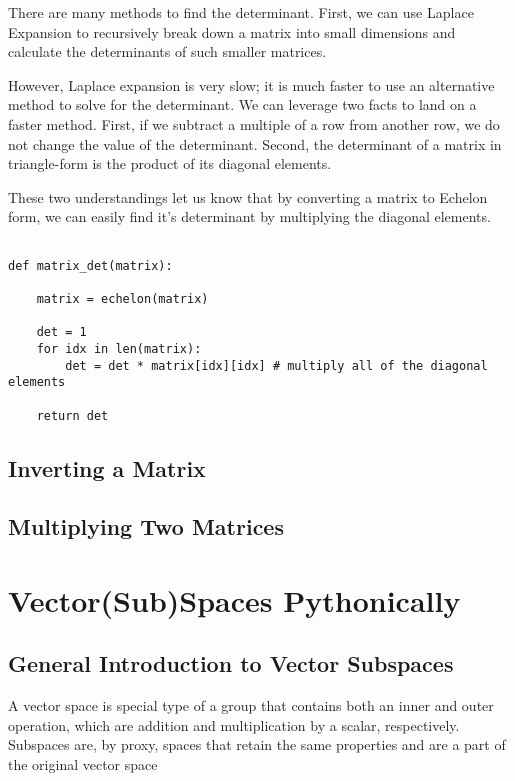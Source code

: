 \documentclass[12pt, a4paper]{article}
\begin{document}
There are many methods to find the determinant. First, we can use Laplace Expansion to recursively break down a matrix into small dimensions
and calculate the determinants of such smaller matrices. 

However, Laplace expansion is very slow; it is much faster to use an alternative method to solve for the determinant. 
We can leverage two facts to land on a faster method. First, if we subtract a multiple of a row from another row, 
we do not change the value of the determinant. Second, the determinant of a matrix in triangle-form is the product of its diagonal elements. 

These two understandings let us know that by converting a matrix to Echelon form, we can easily find it's determinant by multiplying the diagonal elements.

\begin{lstlisting}

def matrix_det(matrix):

    matrix = echelon(matrix)

    det = 1
    for idx in len(matrix):
        det = det * matrix[idx][idx] # multiply all of the diagonal elements

    return det

\end{lstlisting}


\subsection{Inverting a Matrix}

\subsection{Multiplying Two Matrices}

\section{Vector(Sub)Spaces Pythonically}

\subsection{General Introduction to Vector Subspaces}

A vector space is special type of a group that contains both an inner and outer
operation, which are addition and multiplication by a scalar, respectively. Subspaces are, by proxy, spaces that retain the same properties and are a part of the original vector space
\end{document}
